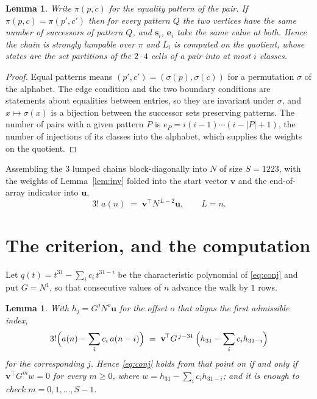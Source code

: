 \documentclass[11pt,a4paper]{article}
\theoremstyle{plain}
\newtheorem{lemma}[theorem]{Lemma}
\theoremstyle{definition}
\begin{document}
\begin{lemma}\label{lem:lump}
Write $\pi(p,c)$ for the equality pattern of the pair. If $\pi(p,c)=\pi(p',c')$ then for
every pattern $Q$ the two vertices have the same number of successors of pattern $Q$, and
$\mathbf{s}_i$, $\mathbf{e}_i$ take the same value at both. Hence the chain is strongly
lumpable over $\pi$ and $L_i$ is computed on the quotient, whose states are the set
partitions of the $2\cdot4$ cells of a pair into at most $i$ classes.
\end{lemma}

\begin{proof}
Equal patterns means $(p',c')=(\sigma(p),\sigma(c))$ for a permutation $\sigma$ of the
alphabet. The edge condition and the two boundary conditions are statements about equalities
between entries, so they are invariant under $\sigma$, and $x\mapsto\sigma(x)$ is a bijection
between the successor sets preserving patterns. The number of pairs with a given pattern $P$
is $e_P=i(i-1)\cdots(i-|P|+1)$, the number of injections of its classes into the alphabet,
which supplies the weights on the quotient.
\end{proof}

Assembling the $3$ lumped chains block-diagonally into $N$ of size $S=1223$, with the
weights of Lemma~\ref{lem:inv} folded into the start vector $\mathbf{v}$ and the
end-of-array indicator into $\mathbf{u}$,
\begin{equation}\label{eq:walk2}
3!\;a(n)\;=\;\mathbf{v}^{\!\top}N^{\,L-2}\mathbf{u},\qquad L=n .
\end{equation}

\section{The criterion, and the computation}

Let $q(t)=t^{31}-\sum_i c_i\,t^{31-i}$ be the characteristic polynomial of
\eqref{eq:conj} and put $G=N^{1}$, so that consecutive values of $n$ advance the
walk by $1$ rows.

\begin{lemma}\label{lem:crit}
With $h_j=G^{j}N^{o}\mathbf{u}$ for the offset $o$ that aligns the first admissible
index,
\[
3!\Bigl(a(n)-\sum_i c_i\,a(n-i)\Bigr)\;=\;\mathbf{v}^{\!\top}G^{\,j-31}\,
\Bigl(h_{31}-\sum_i c_i h_{31-i}\Bigr)
\]
for the corresponding $j$. Hence \eqref{eq:conj} holds from that point on if and only if
$\mathbf{v}^{\!\top}G^{m}w=0$ for every $m\ge0$, where
$w=h_{31}-\sum_i c_ih_{31-i}$; and it is enough to check $m=0,1,\dots,S-1$.
\end{lemma}
\end{document}
